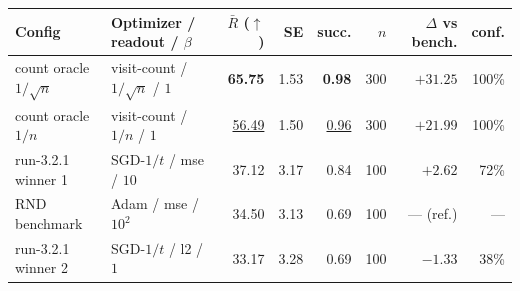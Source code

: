 \begin{tabular}{@{}l l r r r r r r@{}}
\toprule
\textbf{Config} & \textbf{Optimizer / readout / $\beta$} & \textbf{$\bar{R}$ ($\uparrow$)} & \textbf{SE} & \textbf{succ.} & \textbf{$n$} & \textbf{$\Delta$ vs bench.} & \textbf{conf.} \\
\midrule
count oracle $1/\sqrt{n}$ & visit-count / $1/\sqrt{n}$ / $1$ & \textbf{65.75} & 1.53 & \textbf{0.98} & 300 & $+31.25$ & 100\% \\
count oracle $1/n$ & visit-count / $1/n$ / $1$ & \underline{56.49} & 1.50 & \underline{0.96} & 300 & $+21.99$ & 100\% \\
run-3.2.1 winner 1 & SGD-$1/t$ / mse / $10$ & 37.12 & 3.17 & 0.84 & 100 & $+2.62$ & 72\% \\
RND benchmark & Adam / mse / $10^{2}$ & 34.50 & 3.13 & 0.69 & 100 & --- (ref.) & --- \\
run-3.2.1 winner 2 & SGD-$1/t$ / l2 / $1$ & 33.17 & 3.28 & 0.69 & 100 & $-1.33$ & 38\% \\
\bottomrule
\end{tabular}
